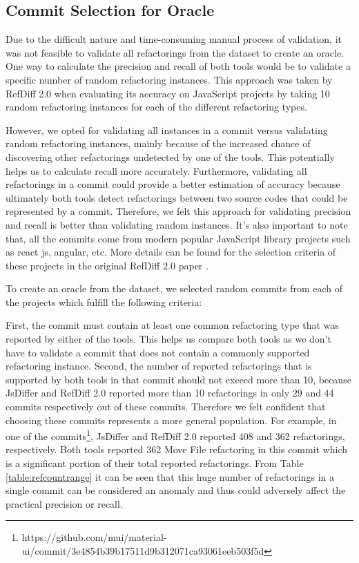 \documentclass[letterpaper,12pt,onecolumn,final]{report}
\begin{document}
\subsection {Commit Selection for Oracle}
Due to the difficult nature and time-consuming manual process of validation, it was not feasible to validate all refactorings from the dataset to create an oracle. One way to calculate the precision and recall of both tools would be to validate a specific number of random refactoring instances. This approach was taken by RefDiff 2.0 when evaluating its accuracy on JavaScript projects by taking 10 random refactoring instances for each of the different refactoring types.

However, we opted for validating all instances in a commit versus validating random refactoring instances, mainly because of the increased chance of discovering other refactorings undetected by one of the tools. This potentially helps us to calculate recall more accurately. Furthermore, validating all refactorings in a commit could provide a better estimation of accuracy because ultimately both tools detect refactorings between two source codes that could be represented by a commit. Therefore, we felt this approach for validating precision and recall is better than validating random instances. It's also important to note that, all the commits come from modern popular JavaScript library projects such as react js, angular, etc. More details can be found for the selection criteria of these projects in the original RefDiff 2.0 paper \cite{Silva2016}.

To create an oracle from the dataset, we selected \evCompareRandomCommitCount{} random commits from each of the projects which fulfill the following criteria:

First, the commit must contain at least one common refactoring type that was reported by either of the tools. This helps us compare both tools as we don't have to validate a commit that does not contain a commonly supported refactoring instance. Second, the number of reported refactorings that is supported by both tools in that commit should not exceed more than 10, because JsDiffer and RefDiff 2.0 reported more than 10 refactorings in only 29 and 44 commits respectively out of these \evCompareRandomCommitCount{} commits. Therefore we felt confident that choosing these commits represents a more general population. For example, in one of the commits\footnote{https://github.com/mui/material-ui/commit/3e4854b39b17511d9b312071ca93061eeb503f5d}, JsDiffer and RefDiff 2.0 reported 408 and 362 refactorings, respectively. Both tools reported 362 Move File refactoring in this commit which is a significant portion of their total reported refactorings. From Table \ref{table:refcountrange} it can be seen that this huge number of refactorings in a single commit can be considered an anomaly and thus could adversely affect the practical precision or recall.
\end{document}
